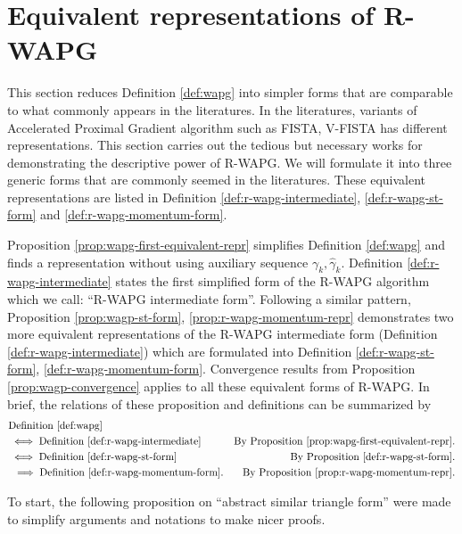 \documentclass[12pt]{article}
\begin{document}
\section{Equivalent representations of R-WAPG}
    This section reduces Definition \ref{def:wapg} into simpler forms that are comparable to what commonly appears in the literatures. 
    In the literatures, variants of Accelerated Proximal Gradient algorithm such as FISTA, V-FISTA has different representations. 
    This section carries out the tedious but necessary works for demonstrating the descriptive power of R-WAPG. 
    We will formulate it into three generic forms that are commonly seemed in the literatures. 
    These equivalent representations are listed in Definition \ref{def:r-wapg-intermediate}, \ref{def:r-wapg-st-form} and \ref{def:r-wapg-momentum-form}. 
    \par 
    Proposition \ref{prop:wapg-first-equivalent-repr} simplifies Definition \ref{def:wapg} and finds a representation without using auxiliary sequence $\gamma_k, \hat \gamma_k$. 
    Definition \ref{def:r-wapg-intermediate} states the first simplified form of the R-WAPG algorithm which we call: ``R-WAPG intermediate form''. 
    Following a similar pattern, Proposition \ref{prop:wagp-st-form}, \ref{prop:r-wapg-momentum-repr} demonstrates two more equivalent representations of the R-WAPG intermediate form (Definition \ref{def:r-wapg-intermediate}) which are formulated into Definition \ref{def:r-wapg-st-form}, \ref{def:r-wapg-momentum-form}. 
    Convergence results from Proposition \ref{prop:wagp-convergence} applies to all these equivalent forms of R-WAPG. 
    In brief, the relations of these proposition and definitions can be summarized by
    \begin{align*}
        & \text{Definition } \ref{def:wapg} 
        \\
        & \iff 
        \text{Definition } \ref{def:r-wapg-intermediate} & \text{By Proposition }\ref{prop:wapg-first-equivalent-repr}.
        \\
        & \iff \text{Definition }\ref{def:r-wapg-st-form} & \text{By Proposition }\ref{def:r-wapg-st-form}.
        \\
        & \;\implies 
        \text{Definition }\ref{def:r-wapg-momentum-form}. 
        & \text{By Proposition }\ref{prop:r-wapg-momentum-repr}.
    \end{align*}
    
    To start, the following proposition on ``abstract similar triangle form'' were made to simplify arguments and notations to make nicer proofs. 
\end{document}

